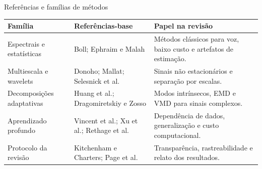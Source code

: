 \documentclass[aspectratio=1610,11pt]{beamer}
\begin{document}
\begin{frame}{Referências e famílias de métodos}
    \hypertarget{fr-referencias}{}
    \small
    \begin{tabularx}{\textwidth}{@{}p{3.25cm}Y Y@{}}
        \toprule
        \textbf{Família} & \textbf{Referências-base} & \textbf{Papel na revisão} \\
        \midrule
        Espectrais e estatísticas & Boll; Ephraim e Malah & Métodos clássicos para voz, baixo custo e artefatos de estimação. \\
        \addlinespace[0.1cm]
        Multiescala e wavelets & Donoho; Mallat; Selesnick et al. & Sinais não estacionários e separação por escalas. \\
        \addlinespace[0.1cm]
        Decomposições adaptativas & Huang et al.; Dragomiretskiy e Zosso & Modos intrínsecos, EMD e VMD para sinais complexos. \\
        \addlinespace[0.1cm]
        Aprendizado profundo & Vincent et al.; Xu et al.; Rethage et al. & Dependência de dados, generalização e custo computacional. \\
        \addlinespace[0.1cm]
        Protocolo da revisão & Kitchenham e Charters; Page et al. & Transparência, rastreabilidade e relato dos resultados. \\
        \bottomrule
    \end{tabularx}
\end{frame}
\end{document}
